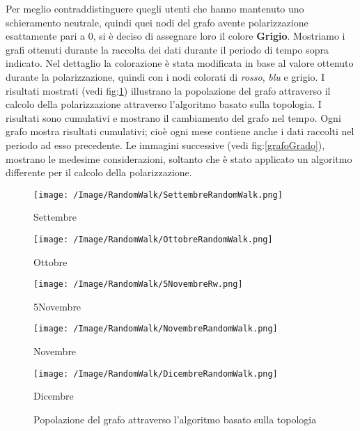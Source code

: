 Per meglio contraddistinguere quegli utenti che hanno mantenuto uno schieramento neutrale, quindi quei nodi del grafo avente polarizzazione esattamente pari a 0, si è deciso di assegnare loro il colore \textbf{Grigio}.
Mostriamo i grafi ottenuti durante la raccolta dei dati durante il periodo di tempo sopra indicato. Nel dettaglio la colorazione è stata modificata in base al valore ottenuto durante la polarizzazione, quindi con i nodi colorati di \textit{rosso}, \textit{blu} e grigio.
I risultati mostrati (vedi fig:\ref{grafoTopologia}) illustrano la popolazione del grafo attraverso il calcolo della polarizzazione attraverso l'algoritmo basato sulla topologia. I risultati sono cumulativi e mostrano il cambiamento del grafo nel tempo. Ogni grafo mostra risultati cumulativi; cioè ogni mese contiene anche i dati  raccolti nel periodo ad esso precedente. Le immagini successive (vedi fig:\ref{grafoGrado}), mostrano le medesime considerazioni, soltanto che è stato applicato un algoritmo differente per il calcolo della polarizzazione.

\begin{figure}[!htbp]
\centering
\begin{minipage}[c]{.40\textwidth}
\centering\setlength{\captionmargin}{0pt}%
\texttt{[image: /Image/RandomWalk/SettembreRandomWalk.png]}
\caption{Settembre}
\label{Passo0}
\end{minipage}%
\hspace{10mm}%
\begin{minipage}[c]{.40\textwidth}
\centering\setlength{\captionmargin}{0pt}%
\texttt{[image: /Image/RandomWalk/OttobreRandomWalk.png]}
\caption{Ottobre}
\label{Passo1}
\end{minipage}
\hspace{10mm}%
\begin{minipage}[c]{.40\textwidth}
\centering\setlength{\captionmargin}{0pt}%
\texttt{[image: /Image/RandomWalk/5NovembreRw.png]}
\caption{5Novembre}
\label{Passo2}
\end{minipage}
\hspace{10mm}%
\begin{minipage}[c]{.40\textwidth}
\centering\setlength{\captionmargin}{0pt}%
\texttt{[image: /Image/RandomWalk/NovembreRandomWalk.png]}
\caption{Novembre}
\label{Passo3}
\end{minipage}
\hspace{10mm}%
\begin{minipage}[c]{.40\textwidth}
\centering\setlength{\captionmargin}{0pt}%
\texttt{[image: /Image/RandomWalk/DicembreRandomWalk.png]}
\caption{Dicembre}
\label{Passo3}
\end{minipage}
\caption{Popolazione del grafo attraverso l'algoritmo basato sulla topologia}\label{grafoTopologia}
\end{figure}


